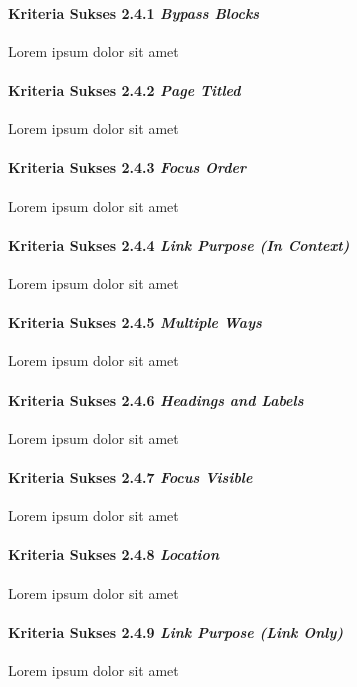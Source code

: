 \paragraph{Kriteria Sukses 2.4.1 \textit{Bypass Blocks}}
\label{sec:kriteria_sukses_2.4.1}
Lorem ipsum dolor sit amet

\paragraph{Kriteria Sukses 2.4.2 \textit{Page Titled}}
\label{sec:kriteria_sukses_2.4.2}
Lorem ipsum dolor sit amet

\paragraph{Kriteria Sukses 2.4.3 \textit{Focus Order}}
\label{sec:kriteria_sukses_2.4.3}
Lorem ipsum dolor sit amet

\paragraph{Kriteria Sukses 2.4.4 \textit{Link Purpose (In Context)}}
\label{sec:kriteria_sukses_2.4.4}
Lorem ipsum dolor sit amet

\paragraph{Kriteria Sukses 2.4.5 \textit{Multiple Ways}}
\label{sec:kriteria_sukses_2.4.5}
Lorem ipsum dolor sit amet

\paragraph{Kriteria Sukses 2.4.6 \textit{Headings and Labels}}
\label{sec:kriteria_sukses_2.4.6}
Lorem ipsum dolor sit amet

\paragraph{Kriteria Sukses 2.4.7 \textit{Focus Visible}}
\label{sec:kriteria_sukses_2.4.7}
Lorem ipsum dolor sit amet

\paragraph{Kriteria Sukses 2.4.8 \textit{Location}}
\label{sec:kriteria_sukses_2.4.8}
Lorem ipsum dolor sit amet

\paragraph{Kriteria Sukses 2.4.9 \textit{Link Purpose (Link Only)}}
\label{sec:kriteria_sukses_2.4.9}
Lorem ipsum dolor sit amet

